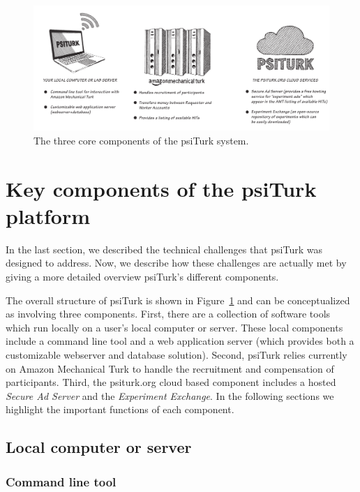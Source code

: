 \documentclass[twocolumn]{svjour3}          %
\newcommand{\psiturk}[0]{\textsf{psiTurk}}
\begin{document}
\begin{figure}[tp]
\centering
\includegraphics[scale=.40]{figures/psiturk-components.pdf}
\caption{The three core components of the \psiturk{} system.  }
\label{fig:components}
\end{figure}


\section{Key components of the \psiturk{} platform}

In the last section, we described the technical challenges that \psiturk{} was designed to address. Now, we describe how these challenges are actually met by giving a more detailed overview \psiturk{}'s different components.

The overall structure of \psiturk{} is shown in Figure~\ref{fig:components}
and can be conceptualized as involving three components.
First, there are a collection of software tools which run locally on a user's
local computer or server.  These local components include a command line tool and 
a web application server (which provides both a customizable webserver and 
database solution).  Second, \psiturk{} relies currently on Amazon
Mechanical Turk to handle the recruitment and compensation of participants.
Third, the \textsf{psiturk.org} cloud based component includes a hosted \emph{Secure Ad Server}
and the \emph{Experiment Exchange}.  In the following sections we highlight the important 
functions of each component.

\subsection{Local computer or server}

\subsubsection{Command line tool}
\label{sec:cli}
\end{document}
